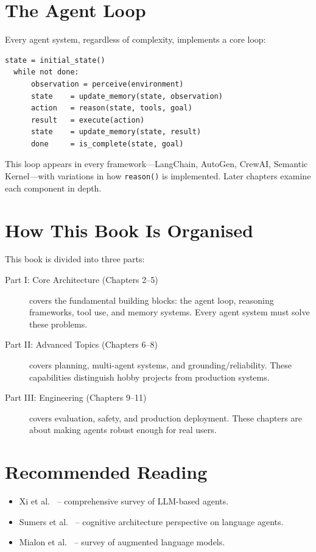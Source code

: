 \section{The Agent Loop}

Every agent system, regardless of complexity, implements a core loop:

\begin{lstlisting}[caption=The universal agent loop]
  state = initial_state()
  while not done:
      observation = perceive(environment)
      state    = update_memory(state, observation)
      action   = reason(state, tools, goal)
      result   = execute(action)
      state    = update_memory(state, result)
      done     = is_complete(state, goal)
\end{lstlisting}

This loop appears in every framework---LangChain, AutoGen, CrewAI, Semantic Kernel---with variations in how \texttt{reason()} is implemented. Later chapters examine each component in depth.

\section{How This Book Is Organised}

This book is divided into three parts:

\begin{description}
	\item[Part I: Core Architecture (Chapters 2--5)] covers the fundamental building blocks: the agent loop, reasoning frameworks, tool use, and memory systems. Every agent system must solve these problems.
	\item[Part II: Advanced Topics (Chapters 6--8)] covers planning, multi-agent systems, and grounding/reliability. These capabilities distinguish hobby projects from production systems.
	\item[Part III: Engineering (Chapters 9--11)] covers evaluation, safety, and production deployment. These chapters are about making agents robust enough for real users.
\end{description}

\section{Recommended Reading}

\begin{itemize}
	\item Xi et al.~\cite{xi2023rise} -- comprehensive survey of LLM-based agents.
	\item Sumers et al.~\cite{sumers2024cognitive} -- cognitive architecture perspective on language agents.
	\item Mialon et al.~\cite{mialon2023augmented} -- survey of augmented language models.
\end{itemize}


